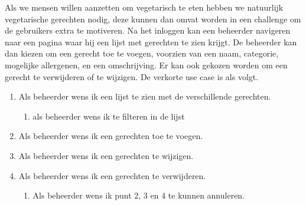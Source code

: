 Als we mensen willen aanzetten om vegetarisch te eten hebben we natuurlijk vegetarische
gerechten nodig, deze kunnen dan omvat worden in een challenge om de gebruikers extra te
motiveren. Na het inloggen kan een beheerder navigeren naar een pagina waar hij een lijst
met gerechten te zien krijgt. De beheerder kan dan kiezen om een gerecht toe te voegen, voorzien
van een naam, categorie, mogelijke allergenen, en een omschrijving. Er kan ook gekozen worden
om een gerecht te verwijderen of te wijzigen. De verkorte use case is als volgt.

\begin{enumerate}
	\item Als beheerder wens ik een lijst te zien met de verschillende gerechten.
	\begin{enumerate}
		\item als beheerder wens ik te filteren in de lijst
	\end{enumerate}
	\item Als beheerder wens ik een gerechten toe te voegen.
	\item Als beheerder wens ik een gerechten te wijzigen.
	\item Als beheerder wens ik een gerechten te verwijderen.
	\begin{enumerate}
		\item Als beheerder wens ik punt 2, 3 en 4 te kunnen annuleren.
	\end{enumerate}
\end{enumerate}






